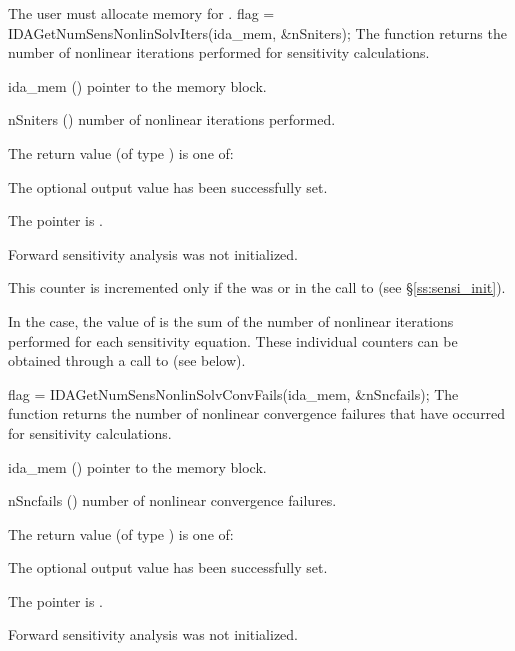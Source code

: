 {
  The user must allocate memory for .
}
{
  flag = IDAGetNumSensNonlinSolvIters(ida\_mem, \&nSniters);
}
{
  The function  returns the
  number of nonlinear iterations performed for 
  sensitivity calculations.
}
{
  \begin{args}
  \item[ida\_mem] ()
    pointer to the {\idas} memory block.
  \item[nSniters] ()
    number of nonlinear iterations performed.
  \end{args}
}
{
  The return value  (of type ) is one of:
  \begin{args}
  \item[\Id{IDA\_SUCCESS}] 
    The optional output value has been successfully set.
  \item[\Id{IDA\_MEM\_NULL}]
    The  pointer is .
  \item[\Id{IDA\_NO\_SENS}]
    Forward sensitivity analysis was not initialized.
  \end{args}
}
{
  This counter is incremented only if the  was  or 
   in the call to  (see \S\ref{ss:sensi_init}).
  
  In the  case, the value of  is the sum of 
  the number of nonlinear iterations performed for each sensitivity equation.
  These individual counters can be obtained through a call to
   (see below).
}
{
  flag = IDAGetNumSensNonlinSolvConvFails(ida\_mem, \&nSncfails);
}
{
  The function  returns the
  number of nonlinear convergence failures that have occurred for
  sensitivity calculations.
}
{
  \begin{args}
  \item[ida\_mem] ()
    pointer to the {\idas} memory block.
  \item[nSncfails] ()
    number of nonlinear convergence failures.
  \end{args}
}
{
  The return value  (of type ) is one of:
  \begin{args}
  \item[\Id{IDA\_SUCCESS}] 
    The optional output value has been successfully set.
  \item[\Id{IDA\_MEM\_NULL}]
    The  pointer is .
  \item[\Id{IDA\_NO\_SENS}]
    Forward sensitivity analysis was not initialized.
  \end{args}
}
